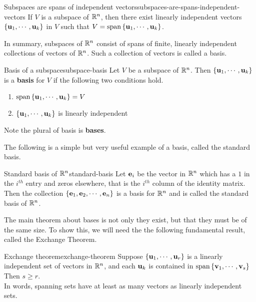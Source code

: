 \begin{corollary}{Subspaces are spans of independent vectors}{subspaces-are-spans-independent-vectors}
If $V$ is a subspace of $\mathbb{R}^{n}$, then there exist linearly independent 
vectors $\left\{\mbox{\bf u}_{1},\cdots ,\mbox{\bf u}_{k}\right\}$ in $V$ such
that $V=\sspan\set{\vect{u}_{1},\cdots ,\vect{u}_{k}}$.
\end{corollary}

In summary, subspaces of $\mathbb{R}^{n}$ consist of spans of finite,
linearly independent collections of vectors of $\mathbb{R}^{n}$.  Such
a collection of vectors is called a basis.

\begin{definition}{Basis of a subspace}{subspace-basis}
Let $V$ be a subspace of $\mathbb{R}^{n}$. Then $\left\{
\mbox{\bf u}_{1},\cdots ,\mbox{\bf u}_{k}\right\} $ is a \textbf{basis} for $V$ if the following two conditions hold.

\begin{enumerate}
\item $\sspan\set{\vect{u}_{1},\cdots ,\vect{u}_{k}} =V$
\item $\left\{\mbox{\bf u}_{1},\cdots ,\mbox{\bf u}_{k}\right\} $ is linearly
independent
\end{enumerate}

Note the plural of basis is \textbf{bases}. 
\end{definition}

The following is a simple but very useful example of a basis, called the standard basis.

\begin{definition}{Standard basis of $\mathbb{R}^n$}{standard-basis}
Let $\mbox{\bf e}_i$ be the vector in $\mathbb{R}^n$ which has a $1$ in the $i^{th}$ entry and zeros elsewhere, that is the $i^{th}$ column of the identity matrix. Then the collection $\left\{\mbox{\bf e}_1, \mbox{\bf e}_2, \cdots, \mbox{\bf e}_n
\right\}$ is a basis for
$\mathbb{R}^n$ and is called the standard basis of $\mathbb{R}^n$.
\end{definition}

The main theorem about bases is not only they exist, but that they
must be of the same size. To show this, we will need the the following
fundamental result, called the Exchange Theorem.

\begin{theorem}{Exchange theorem}{exchange-theorem}
Suppose $\left\{\mbox{\bf u}_{1},\cdots ,\mbox{\bf u}_{r}\right\} $ is a
linearly independent set of vectors in $\mathbb{R}^n$, and each
$\mbox{\bf u}_{k}$ is contained in $\sspan\set{\vect{v}_{1},\cdots
,\vect{v}_{s}}$ Then $s\geq r$. \\
In words, spanning sets have at least as many vectors as linearly
independent sets.
\end{theorem}

